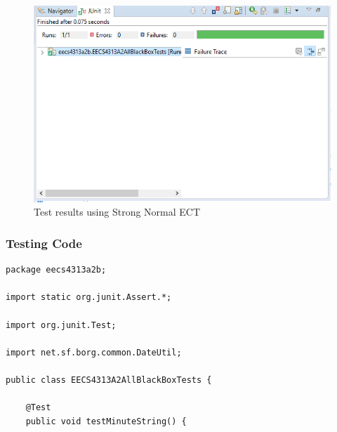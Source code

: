 \documentclass[fontsize=12pt,paper=letter,twoside]{scrartcl}
\begin{document}
\begin{itemize}
\begin{figure}[!htb]
\begin{center}
\includegraphics[width=.99\textwidth]{images/bbt/bbt_ect.png}
\end{center}
\caption{Test results using Strong Normal ECT}
\label{fig:bbt_ect}
\end{figure}

\newpage
\subsubsection{Testing Code}
\begin{lstlisting}
package eecs4313a2b;

import static org.junit.Assert.*;

import org.junit.Test;

import net.sf.borg.common.DateUtil;

public class EECS4313A2AllBlackBoxTests {

	@Test
	public void testMinuteString() {


\end{lstlisting}
\end{itemize}
\end{document}
